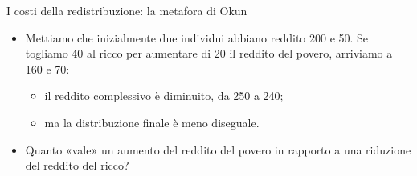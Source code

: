 \documentclass[aspectratio=64,12pt]{beamer}
\begin{document}
\begin{frame}{I costi della redistribuzione: la metafora di Okun}
\hspace*{-3mm}
\begin{minipage}{1.05\linewidth}
\begin{itemize}
\item Mettiamo che inizialmente due individui abbiano reddito 200 e 50.  Se
togliamo 40 al ricco per aumentare di 20 il reddito del povero, arriviamo a
160 e 70:
\begin{itemize}
\item il reddito complessivo è diminuito, da 250 a 240;
\item ma la distribuzione finale è meno diseguale.
\end{itemize}
\item Quanto «vale» un aumento del reddito del povero in rapporto a una riduzione
del reddito del ricco?
\end{itemize}
\end{minipage}
\end{frame}
\end{document}
